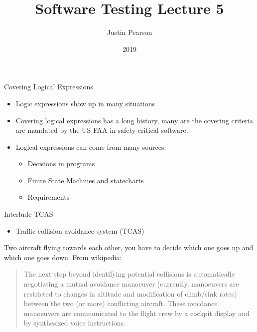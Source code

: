 \documentclass{beamer}
\title{Software Testing  Lecture 5}
\author{Justin Pearson}
\date{2019}
\begin{document}
\lstset{language=C}

\begin{frame}
  \maketitle
\end{frame}

\begin{frame}{Covering Logical Expressions}
  \begin{itemize}
  \item Logic expressions show up in many situations
  \item Covering logical expressions has a long history, many are the
    covering criteria are mandated by the US FAA in safety critical
    software.
  \item Logical expressions can come from many sources:
    \begin{itemize}
    \item Decisions in programs
    \item Finite State Machines and statecharts 
    \item Requirements
    \end{itemize}
  \end{itemize}
  
\end{frame}
\begin{frame}{Interlude TCAS}
  \begin{itemize}
  \item Traffic collision avoidance system (TCAS)
  \end{itemize}
  Two aircraft flying towards each other, you have to decide which one
  goes up and which one goes down. From wikipedia:
  \begin{quote}
    The next step beyond identifying potential collisions is
    automatically negotiating a mutual avoidance manoeuver (currently,
    manoeuvers are restricted to changes in altitude and modification
    of climb/sink rates) between the two (or more) conflicting
    aircraft. These avoidance manoeuvers are communicated to the
    flight crew by a cockpit display and by synthesized voice
    instructions.
  \end{quote}
  
\end{frame}
\end{document}

